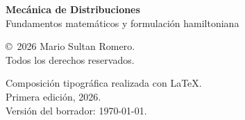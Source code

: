 \begin{pagina}
\thispagestyle{empty}
\vspace*{\fill}
\small\raggedright
\textbf{Mecánica de Distribuciones}\\
Fundamentos matemáticos y formulación hamiltoniana

\bigskip

\copyright\ 2026 Mario Sultan Romero.\\
Todos los derechos reservados.

\bigskip

Composición tipográfica realizada con \LaTeX.\\
Primera edición, 2026.\\
Versión del borrador: \today.

\bigskip

\end{pagina}
